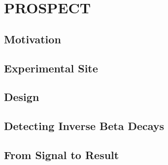 \chapter{PROSPECT}

\section{Motivation}

\section{Experimental Site}

\section{Design}

\section{Detecting Inverse Beta Decays}

\section{From Signal to Result}


